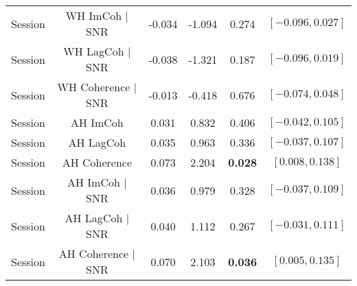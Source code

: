 {\begin{tabular}{cccccc}
\addlinespace
Session & WH ImCoh $|$ SNR & -0.034 & -1.094 & 0.274 & $[-0.096, 0.027]$\\
Session & WH LagCoh $|$ SNR & -0.038 & -1.321 & 0.187 & $[-0.096, 0.019]$\\
Session & WH Coherence $|$ SNR & -0.013 & -0.418 & 0.676 & $[-0.074, 0.048]$\\
\addlinespace
Session & AH ImCoh & 0.031 & 0.832 & 0.406 & $[-0.042, 0.105]$\\
Session & AH LagCoh & 0.035 & 0.963 & 0.336 & $[-0.037, 0.107]$\\
Session & AH Coherence & 0.073 & 2.204 & \textbf{0.028} & $[ 0.008, 0.138]$\\
\addlinespace
Session & AH ImCoh $|$ SNR & 0.036 & 0.979 & 0.328 & $[-0.037, 0.109]$\\
Session & AH LagCoh $|$ SNR & 0.040 & 1.112 & 0.267 & $[-0.031, 0.111]$\\
Session & AH Coherence $|$ SNR & 0.070 & 2.103 & \textbf{0.036} & $[ 0.005, 0.135]$\\
\bottomrule
\end{tabular}}
